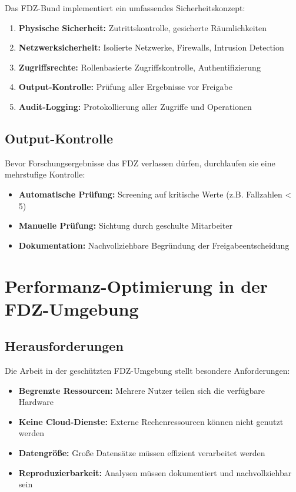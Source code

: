 \documentclass[
  ngerman,
  10pt,
  letterpaper,
  twocolumn]{book}
\providecommand{\tightlist}{%
  \setlength{\itemsep}{0pt}\setlength{\parskip}{0pt}}
\begin{document}
Das FDZ-Bund implementiert ein umfassendes Sicherheitskonzept:

\begin{enumerate}
\def\labelenumi{\arabic{enumi}.}
\tightlist
\item
  \textbf{Physische Sicherheit:} Zutrittskontrolle, gesicherte
  Räumlichkeiten
\item
  \textbf{Netzwerksicherheit:} Isolierte Netzwerke, Firewalls, Intrusion
  Detection
\item
  \textbf{Zugriffsrechte:} Rollenbasierte Zugriffskontrolle,
  Authentifizierung
\item
  \textbf{Output-Kontrolle:} Prüfung aller Ergebnisse vor Freigabe
\item
  \textbf{Audit-Logging:} Protokollierung aller Zugriffe und Operationen
\end{enumerate}

\subsection{Output-Kontrolle}\label{output-kontrolle}

Bevor Forschungsergebnisse das FDZ verlassen dürfen, durchlaufen sie
eine mehrstufige Kontrolle:

\begin{itemize}
\tightlist
\item
  \textbf{Automatische Prüfung:} Screening auf kritische Werte (z.B.
  Fallzahlen \textless{} 5)
\item
  \textbf{Manuelle Prüfung:} Sichtung durch geschulte Mitarbeiter
\item
  \textbf{Dokumentation:} Nachvollziehbare Begründung der
  Freigabeentscheidung
\end{itemize}

\section{Performanz-Optimierung in der
FDZ-Umgebung}\label{performanz-optimierung-in-der-fdz-umgebung}

\subsection{Herausforderungen}\label{herausforderungen}

Die Arbeit in der geschützten FDZ-Umgebung stellt besondere
Anforderungen:

\begin{itemize}
\tightlist
\item
  \textbf{Begrenzte Ressourcen:} Mehrere Nutzer teilen sich die
  verfügbare Hardware
\item
  \textbf{Keine Cloud-Dienste:} Externe Rechenressourcen können nicht
  genutzt werden
\item
  \textbf{Datengröße:} Große Datensätze müssen effizient verarbeitet
  werden
\item
  \textbf{Reproduzierbarkeit:} Analysen müssen dokumentiert und
  nachvollziehbar sein
\end{itemize}
\end{document}
